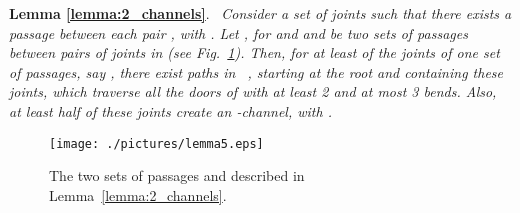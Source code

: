 \documentclass[a4paper,10pt]{llncs}
\newcommand{\rephrase}[3]{\noindent\textbf{#1 #2}.~\emph{#3}}
\newcommand{\T}{\mbox{ }}
\begin{document}
\rephrase{Lemma}{\ref{lemma:2_channels}}{
Consider a set of joints  such that there exists a passage between each pair , with . Let , for  and  and  be two sets of passages between pairs of joints in  (see Fig.~\ref{fig:lemma5}). Then, for at least  of the joints of one set of passages, say , there exist paths in \T, starting at the root and containing these joints, which traverse all the doors of  with at least 2 and at most 3 bends. Also, at least half of these joints create an -channel, with .
}

\begin{figure}[ht]
\begin{center}
\texttt{[image: ./pictures/lemma5.eps]}
\caption{The two sets of passages  and  described in Lemma~\ref{lemma:2_channels}.}
\label{fig:lemma5}
\end{center}
\end{figure}
\end{document}
